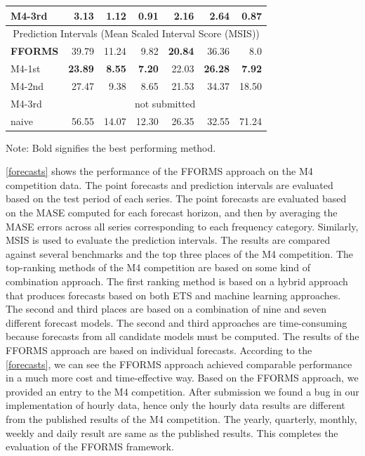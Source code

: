 \documentclass[11pt,a4paper,]{article}
\begin{document}
\begin{table}[!h]
\begin{threeparttable}
\begin{tabular}{l|rrrrrr}
M4-3rd & 3.13 & 1.12 &  0.91& 2.16 & \bf{2.64} & 0.87\\\hline
\multicolumn{7}{c}{Prediction Intervals (Mean Scaled Interval Score (MSIS))} \\\hline
\bf{FFORMS} & 39.79 &  11.24 &  9.82&  \bf{20.84}& 36.36 & 8.0 \\
M4-1st & \bf{23.89} & \bf{8.55} &  \bf{7.20} & 22.03 & \bf{26.28} & \bf{7.92}\\
M4-2nd & 27.47 & 9.38 &  8.65& 21.53 & 34.37 & 18.50\\
M4-3rd & \multicolumn{6}{c}{not submitted}\\
naive & 56.55 & 14.07 &  12.30 & 26.35 & 32.55 & 71.24\\\hline
\end{tabular}
  \begin{tablenotes}
      \small
      \item Note: Bold signifies the best performing method.
    \end{tablenotes}
  \end{threeparttable}
\end{table}

\autoref{forecasts} shows the performance of the FFORMS approach on the M4 competition data. The point forecasts and prediction intervals are evaluated based on the test period of each series. The point forecasts are evaluated based on the MASE computed for each forecast horizon, and then by averaging the MASE errors across all series corresponding to each frequency category. Similarly, MSIS is used to evaluate the prediction intervals. The results are compared against several benchmarks and the top three places of the M4 competition. The top-ranking methods of the M4 competition are based on some kind of combination approach. The first ranking method is based on a hybrid approach that produces forecasts based on both ETS and machine learning approaches. The second and third places are based on a combination of nine and seven different forecast models. The second and third approaches are time-consuming because forecasts from all candidate models must be computed. The results of the FFORMS approach are based on individual forecasts. According to the \autoref{forecasts}, we can see the FFORMS approach achieved comparable performance in a much more cost and time-effective way. Based on the FFORMS approach, we provided an entry to the M4 competition. After submission we found a bug in our implementation of hourly data, hence only the hourly data results are different from the published results of the M4 competition. The yearly, quarterly, monthly, weekly and daily result are same as the published results. This completes the evaluation of the FFORMS framework.
\end{document}
